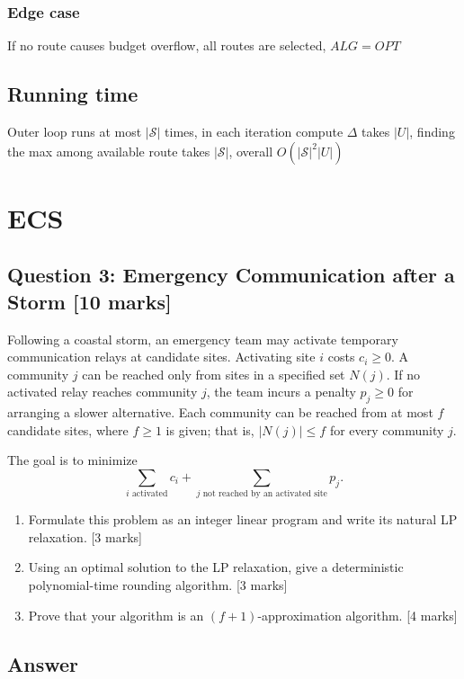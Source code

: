 \documentclass[10pt]{article}
\theoremstyle{definition}
\begin{document}
\subsubsection*{Edge case}
If no route causes budget overflow, all routes are selected, $ALG = OPT$
\subsection{Running time}
Outer loop runs at most $|\mathcal{S}|$ times, in each iteration compute $\Delta$ takes $|U|$, finding the max among available route takes $|\mathcal{S}|$, overall
$O(|\mathcal{S}|^2|U|)$
\section{ECS}
\subsection*{Question 3: Emergency Communication after a Storm [10 marks]}

Following a coastal storm, an emergency team may activate temporary communication relays at
candidate sites. Activating site $i$ costs $c_i\geq 0$. A community $j$ can be reached only from sites in
a specified set $N(j)$. If no activated relay reaches community $j$, the team incurs a penalty $p_j\geq 0$
for arranging a slower alternative. Each community can be reached from at most $f$ candidate sites,
where $f\geq 1$ is given; that is, $|N(j)|\leq f$ for every community $j$.

The goal is to minimize
\[
\sum_{i\text{ activated}}c_i+
\sum_{j\text{ not reached by an activated site}}p_j.
\]

\begin{enumerate}[label=(\alph*)]
  \item Formulate this problem as an integer linear program and write its natural LP relaxation. [3 marks]
  \item Using an optimal solution to the LP relaxation, give a deterministic polynomial-time rounding
  algorithm. [3 marks]
  \item Prove that your algorithm is an $(f+1)$-approximation algorithm. [4 marks]
\end{enumerate}

\subsection*{Answer}
\end{document}
